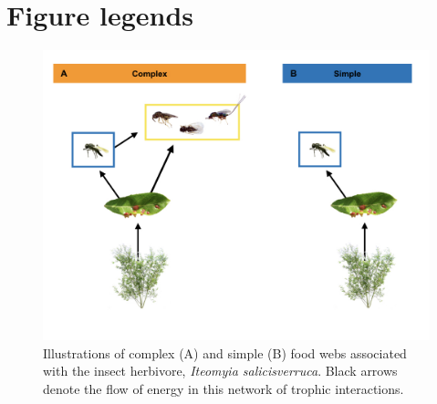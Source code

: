 \section*{Figure legends}

\begin{figure}
\centering
\includegraphics{analyses/complex_simple_foodwebs.jpeg}
\caption{\label{fig:Conceptual}Illustrations of complex (A) and simple
(B) food webs associated with the insect herbivore, \emph{Iteomyia
salicisverruca}. Black arrows denote the flow of energy in this network
of trophic interactions.}
\end{figure}
